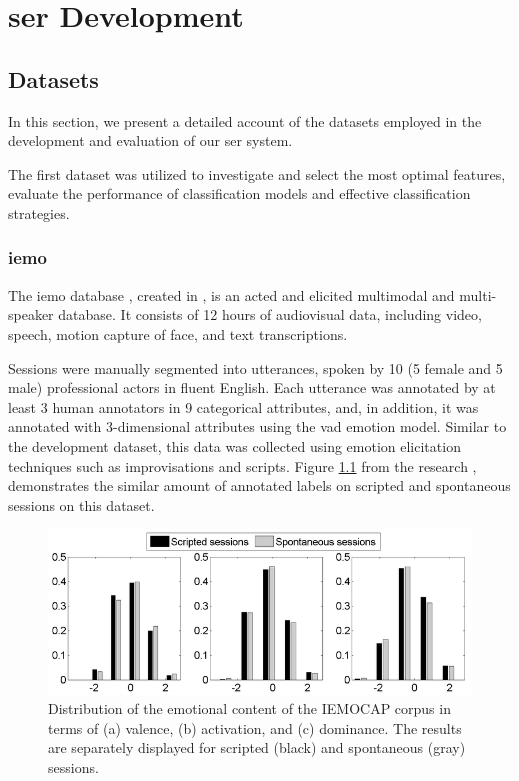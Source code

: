 \chapter{\ac{ser} Development}
\label{chapter:strat}

\section{Datasets}

In this section, we present a detailed account of the datasets employed in the development and evaluation of our \ac{ser} system.

The first dataset was utilized to investigate and select the most optimal features, evaluate the performance of classification models and effective classification strategies.

\subsection{\ac{iemo}}

The \ac{iemo} database \cite{Busso2008}, created in \citeyear{Busso2008}, is an acted and elicited multimodal and multi-speaker database. It consists of 12 hours of audiovisual data, including video, speech, motion capture of face, and text transcriptions.

Sessions were manually segmented into utterances, spoken by 10 (5 female and 5 male) professional actors in fluent English. Each utterance was annotated by at least 3 human annotators in 9 categorical attributes, and, in addition, it was annotated with 3-dimensional attributes using the \ac{vad} emotion model. Similar to the development dataset, this data was collected using emotion elicitation techniques such as improvisations and scripts. Figure \ref{fig:bar_plots_distribution} from the research  \cite{Busso2008}, demonstrates the similar amount of annotated labels on scripted and spontaneous sessions on this dataset.

\begin{figure}[H]
	\centering
	\includegraphics[width=.8\linewidth]{figs/4_1_traditional/scripted_spont_distribution.png}
	\caption{Distribution of the emotional content of the IEMOCAP corpus in terms of (a) valence, (b) activation, and (c) dominance. The results are separately displayed for scripted (black) and spontaneous (gray) sessions.}
	\label{fig:bar_plots_distribution}
\end{figure}

